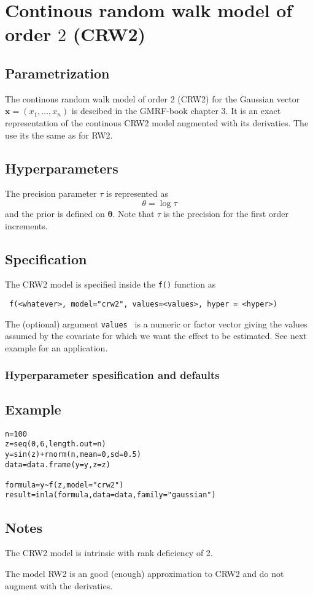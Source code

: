 \documentclass[a4paper,11pt]{article}
\begin{document}
\section*{Continous random walk model of order $2$ (CRW2)}

\subsection*{Parametrization}

The continous random walk model of order $2$ (CRW2) for the Gaussian
vector $\mathbf{x}=(x_1,\dots,x_n)$ is descibed in the GMRF-book
chapter 3. It is an exact representation of the continous CRW2 model
augmented with its derivaties. The use its the same as for RW2. 

\subsection*{Hyperparameters}

The precision parameter $\tau$ is represented as
\begin{displaymath}
    \theta =\log \tau
\end{displaymath}
and the prior is defined on $\mathbf{\theta}$. Note that $\tau$ is the
precision for the first order increments.

\subsection*{Specification}

The CRW2 model is specified inside the {\tt f()} function as
\begin{verbatim}
 f(<whatever>, model="crw2", values=<values>, hyper = <hyper>)
\end{verbatim}
The (optional) argument {\tt values } is a numeric or factor vector
giving the values assumed by the covariate for which we want the
effect to be estimated. See next example for an application.
 
\subsubsection*{Hyperparameter spesification and defaults}



\subsection*{Example}

\begin{verbatim}
n=100
z=seq(0,6,length.out=n)
y=sin(z)+rnorm(n,mean=0,sd=0.5)
data=data.frame(y=y,z=z)

formula=y~f(z,model="crw2")
result=inla(formula,data=data,family="gaussian")
\end{verbatim}


\subsection*{Notes}

The CRW2 model is intrinsic with rank deficiency of 2.

The model RW2 is an good (enough) approximation to CRW2 and do not
augment with the derivaties.
\end{document}
